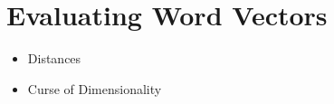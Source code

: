 \chapter{Evaluating Word Vectors}\label{ch:eval}

\begin{itemize}
  \item Distances
  \item Curse of Dimensionality
\end{itemize}